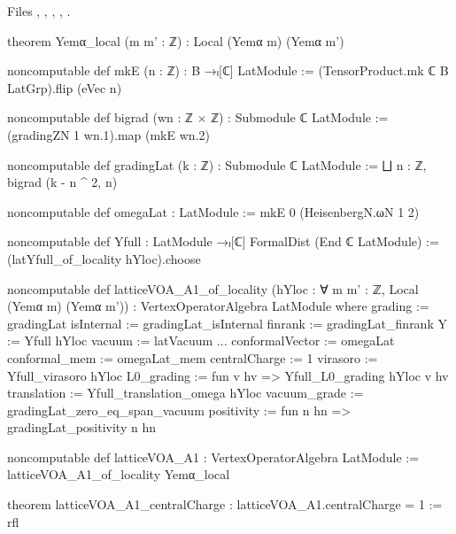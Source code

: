 \noindent Files , ,
, ,
.
\begin{leancode}
theorem Yemα_local (m m' : ℤ) : Local (Yemα m) (Yemα m')

noncomputable def mkE (n : ℤ) : B →ₗ[ℂ] LatModule :=
  (TensorProduct.mk ℂ B LatGrp).flip (eVec n)

noncomputable def bigrad (wn : ℤ × ℤ) : Submodule ℂ LatModule :=
  (gradingZN 1 wn.1).map (mkE wn.2)

noncomputable def gradingLat (k : ℤ) : Submodule ℂ LatModule :=
  ⨆ n : ℤ, bigrad (k - n ^ 2, n)

noncomputable def omegaLat : LatModule := mkE 0 (HeisenbergN.ωN 1 2)

noncomputable def Yfull : LatModule →ₗ[ℂ] FormalDist (End ℂ LatModule) :=
  (latYfull_of_locality hYloc).choose

noncomputable def latticeVOA_A1_of_locality
    (hYloc : ∀ m m' : ℤ, Local (Yemα m) (Yemα m')) :
    VertexOperatorAlgebra LatModule where
  grading := gradingLat
  isInternal := gradingLat_isInternal
  finrank := gradingLat_finrank
  Y := Yfull hYloc
  vacuum := latVacuum
  ...
  conformalVector := omegaLat
  conformal_mem := omegaLat_mem
  centralCharge := 1
  virasoro := Yfull_virasoro hYloc
  L0_grading := fun v hv => Yfull_L0_grading hYloc v hv
  translation := Yfull_translation_omega hYloc
  vacuum_grade := gradingLat_zero_eq_span_vacuum
  positivity := fun n hn => gradingLat_positivity n hn

noncomputable def latticeVOA_A1 : VertexOperatorAlgebra LatModule :=
  latticeVOA_A1_of_locality Yemα_local

theorem latticeVOA_A1_centralCharge : latticeVOA_A1.centralCharge = 1 := rfl
\end{leancode}

